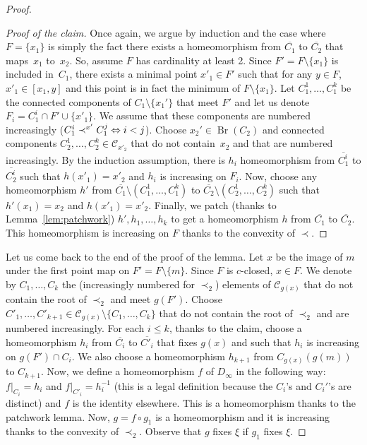 \documentclass[JEP,XML,SOM,Unicode,NoFloatCountersInSection]{cedram}
\newcommand\ssi{\mathchoice{\iff}{\Leftrightarrow}{\Leftrightarrow}{\Leftrightarrow}}
\let\mathcal\mathscr
\theoremstyle{plain}
\theoremstyle{definition}
\newcommand{\cC}{\mathcal{C}}
\DeclareMathOperator{\Br}{Br}
\begin{document}
\begin{proof}
\begin{proof}[Proof of the claim]
Once again, we argue by induction and the case where $F=\{x_1\}$ is simply the fact there exists a homeomorphism from $\overline{C_1}$ to $\overline{C_2}$ that maps~$x_1$ to~$x_2$. So, assume $F$ has cardinality at least 2. Since $F'=F\setminus\{x_1\}$ is included in~$C_1$, there exists a minimal point $x'_1\in F'$ such that for any $y\in F$, $x'_1\in[x_1,y]$ and this point is in fact the minimum of $F\setminus\{x_1\}$. Let $C^1_1,\dots,C^k_1$ be the connected components of $C_1\setminus\{x_1'\}$ that meet $F'$ and let us denote $F_i=C^i_1\cap F'\cup\{x'_1\}$. We assume that these components are numbered increasingly ($C^i_1\prec^{x'}C^j_1\ssi i<j$). Choose $x_2'\in\Br(C_2)$ and connected components $C^1_2,\dots,C^k_2\in\cC_{x'_2}$ that do not contain~$x_2$ and that are numbered increasingly. By the induction assumption, there is $h_i$ homeomorphism from $\overline{C^i_1}$ to $\overline{C^i_2}$ such that $h(x'_1)=x'_2$ and $h_i$ is increasing on $F_i$. Now, choose any homeomorphism $h'$ from $\overline{C_1}\setminus\left(C^1_1,\dots,C^k_1\right)$ to $\overline{C_2}\setminus\left(C^1_2,\dots,C^k_2\right)$ such that $h'(x_1)=x_2$ and $h(x'_1)=x'_2$. Finally, we patch (thanks to Lemma~\ref{lem:patchwork}) $h',h_1,\dots,h_k$ to get a homeomorphism $h$ from $\overline{C_1}$ to $\overline{C_2}$. This homeomorphism is increasing on $F$ thanks to the convexity of $\prec$.
\end{proof}

Let us come back to the end of the proof of the lemma. Let $x$ be the image of $m$ under the first point map on $F'=F\setminus\{m\}$. Since $F$ is $c$-closed, $x\in F$. We denote by $C_1,\dots,C_k$ the (increasingly numbered for $\prec_2$) elements of $\cC_{g(x)}$ that do not contain the root of $\prec_2$ and meet $g(F')$. Choose $C'_1,\dots,C'_{k+1}\in\cC_{g(x)}\setminus\{C_1,\dots,C_k\}$ that do not contain the root of $\prec_2$ and are numbered increasingly. For each $i\leq k$, thanks to the claim, choose a homeomorphism $h_i$ from $\overline{C_i}$ to $\overline{C'_i}$ that fixes $g(x)$ and such that $h_i$ is increasing on $g(F')\cap C_i$. We also choose a homeomorphism $h_{k+1}$ from $C_{g(x)}(g(m))$ to $C_{k+1}$. Now, we define a homeomorphism $f$ of $D_\infty$ in the following way: $f|_{C_i}=h_i$ and $f|_{C'_i}=h_i^{-1}$ (this is a legal definition because the $C_i$'s and $C_i'$'s are distinct) and $f$ is the identity elsewhere. This is a homeomorphism thanks to the patchwork lemma. Now, $g=f\circ g_1$ is a homeomorphism and it is increasing thanks to the convexity of $\prec_2$. Observe that $g$ fixes $\xi$ if $g_1$ fixes $\xi$.
\end{proof}
\end{document}
